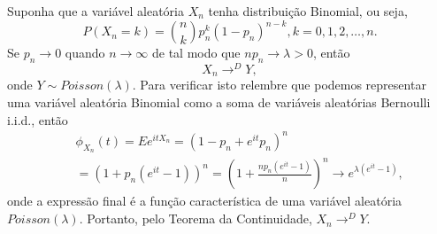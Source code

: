 \begin{frame}


\begin{exem}
Suponha que a variável aleatória $X_n$ tenha distribuição Binomial, ou seja,
$$P(X_n=k)=\binom{n}{k}p_n^k(1-p_n)^{n-k},k=0,1,2,\ldots,n.$$
Se $p_n\rightarrow 0$ quando $n\rightarrow\infty$ de tal modo que $np_n\rightarrow\lambda>0$, então
$$X_n\rightarrow^D Y,$$
onde $Y\sim Poisson(\lambda)$. Para verificar isto relembre que podemos representar uma variável aleatória Binomial como a soma de variáveis aleatórias Bernoulli i.i.d., então
\begin{eqnarray}
& & \phi_{X_n}(t)=Ee^{itX_n}=(1-p_n+e^{it}p_n)^n\nonumber\\
& & =(1+p_n(e^{it}-1))^n=(1+\frac{np_n(e^{it}-1)}{n})^n\rightarrow e^{\lambda(e^{it}-1)},\nonumber
\end{eqnarray}
onde a expressão final é a função característica de uma variável aleatória $Poisson(\lambda)$. Portanto, pelo Teorema da Continuidade, $X_n\rightarrow^D Y$.
\end{exem}


\end{frame}

